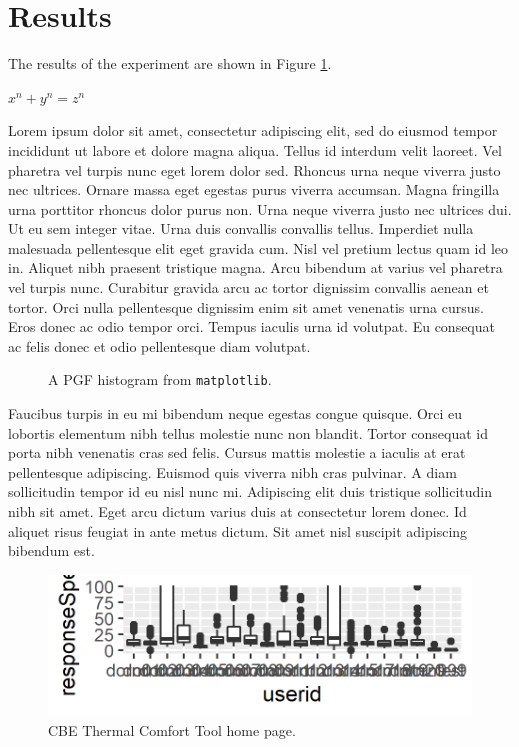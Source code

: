 

\section{Results}

The results of the experiment are shown in Figure \ref{fig:figure_count_responses}.

$ x^n + y^n = z^n $

Lorem ipsum dolor sit amet, consectetur adipiscing elit, sed do eiusmod tempor incididunt ut labore et dolore magna aliqua. Tellus id interdum velit laoreet. Vel pharetra vel turpis nunc eget lorem dolor sed. Rhoncus urna neque viverra justo nec ultrices. Ornare massa eget egestas purus viverra accumsan. Magna fringilla urna porttitor rhoncus dolor purus non. Urna neque viverra justo nec ultrices dui. Ut eu sem integer vitae. Urna duis convallis convallis tellus. Imperdiet nulla malesuada pellentesque elit eget gravida cum. Nisl vel pretium lectus quam id leo in. Aliquet nibh praesent tristique magna. Arcu bibendum at varius vel pharetra vel turpis nunc. Curabitur gravida arcu ac tortor dignissim convallis aenean et tortor. Orci nulla pellentesque dignissim enim sit amet venenatis urna cursus. Eros donec ac odio tempor orci. Tempus iaculis urna id volutpat. Eu consequat ac felis donec et odio pellentesque diam volutpat.

\begin{figure}
    \begin{center}
        
    \end{center}
    \caption{A PGF histogram from \texttt{matplotlib}.}\label{fig:figure_count_responses}
\end{figure}

Faucibus turpis in eu mi bibendum neque egestas congue quisque. Orci eu lobortis elementum nibh tellus molestie nunc non blandit. Tortor consequat id porta nibh venenatis cras sed felis. Cursus mattis molestie a iaculis at erat pellentesque adipiscing. Euismod quis viverra nibh cras pulvinar. A diam sollicitudin tempor id eu nisl nunc mi. Adipiscing elit duis tristique sollicitudin nibh sit amet. Eget arcu dictum varius duis at consectetur lorem donec. Id aliquet risus feugiat in ante metus dictum. Sit amet nisl suscipit adipiscing bibendum est.

\begin{figure}[]
    \centering
    \includegraphics[width=\textwidth]{figures/plot_r.png}
    \caption{CBE Thermal Comfort Tool home page.}
    \label{fig:cbe_ashrae}
\end{figure}

